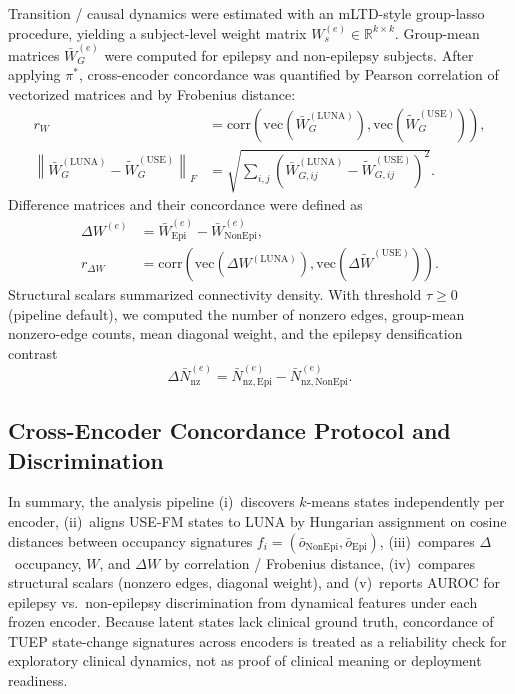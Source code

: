 Transition / causal dynamics were estimated with an mLTD-style group-lasso
procedure, yielding a subject-level weight matrix
$W_s^{(e)}\in\mathbb{R}^{k\times k}$. Group-mean matrices
$\bar{W}_{G}^{(e)}$ were computed for epilepsy and non-epilepsy subjects.
After applying $\pi^{*}$, cross-encoder concordance was quantified by Pearson
correlation of vectorized matrices and by Frobenius distance:
\begin{align*}
r_{W}
&=
\mathrm{corr}\!\left(
\mathrm{vec}(\bar{W}_{G}^{(\mathrm{LUNA})}),
\mathrm{vec}(\tilde{W}_{G}^{(\mathrm{USE})})
\right),
\\
\left\|
\bar{W}_{G}^{(\mathrm{LUNA})}
-
\tilde{W}_{G}^{(\mathrm{USE})}
\right\|_{F}
&=
\sqrt{
\sum_{i,j}
\left(
\bar{W}_{G,ij}^{(\mathrm{LUNA})}
-
\tilde{W}_{G,ij}^{(\mathrm{USE})}
\right)^{2}
}.
\end{align*}
Difference matrices and their concordance were defined as
\begin{align*}
\Delta W^{(e)}
&=
\bar{W}_{\mathrm{Epi}}^{(e)}
-
\bar{W}_{\mathrm{NonEpi}}^{(e)},
\\
r_{\Delta W}
&=
\mathrm{corr}\!\left(
\mathrm{vec}(\Delta W^{(\mathrm{LUNA})}),
\mathrm{vec}(\Delta\tilde{W}^{(\mathrm{USE})})
\right).
\end{align*}
Structural scalars summarized connectivity density. With threshold $\tau\ge 0$
(pipeline default), we computed the number of nonzero edges, group-mean
nonzero-edge counts, mean diagonal weight, and the epilepsy densification
contrast
\[
\Delta\bar{N}_{\mathrm{nz}}^{(e)}
=
\bar{N}_{\mathrm{nz},\mathrm{Epi}}^{(e)}
-
\bar{N}_{\mathrm{nz},\mathrm{NonEpi}}^{(e)}.
\]


\subsection{Cross-Encoder Concordance Protocol and Discrimination}

In summary, the analysis pipeline (i)~discovers $k$-means states independently
per encoder, (ii)~aligns USE-FM states to LUNA by Hungarian assignment on cosine
distances between occupancy signatures
$f_i=(\bar{o}_{\mathrm{NonEpi}},\bar{o}_{\mathrm{Epi}})$,
(iii)~compares $\Delta$~occupancy, $W$, and $\Delta W$ by correlation /
Frobenius distance, (iv)~compares structural scalars (nonzero edges, diagonal
weight), and (v)~reports AUROC for epilepsy vs.\ non-epilepsy discrimination
from dynamical features under each frozen encoder. Because latent states lack
clinical ground truth, concordance of TUEP state-change signatures across
encoders is treated as a reliability check for exploratory clinical dynamics,
not as proof of clinical meaning or deployment readiness.


